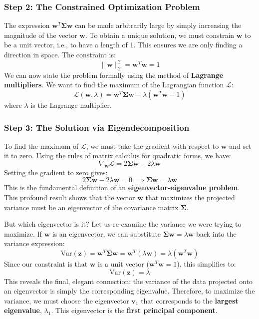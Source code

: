 \subsubsection{Step 2: The Constrained Optimization Problem}
The expression $\mathbf{w}^T \mathbf{\Sigma} \mathbf{w}$ can be made arbitrarily large by simply increasing the magnitude of the vector $\mathbf{w}$. To obtain a unique solution, we must constrain $\mathbf{w}$ to be a unit vector, i.e., to have a length of 1. This ensures we are only finding a direction in space. The constraint is:
$$ \|\mathbf{w}\|_2^2 = \mathbf{w}^T \mathbf{w} = 1 $$
We can now state the problem formally using the method of \textbf{Lagrange multipliers}. We want to find the maximum of the Lagrangian function $\mathcal{L}$:
$$ \mathcal{L}(\mathbf{w}, \lambda) = \mathbf{w}^T \mathbf{\Sigma} \mathbf{w} - \lambda(\mathbf{w}^T \mathbf{w} - 1) $$
where $\lambda$ is the Lagrange multiplier.

\subsubsection{Step 3: The Solution via Eigendecomposition}
To find the maximum of $\mathcal{L}$, we must take the gradient with respect to $\mathbf{w}$ and set it to zero. Using the rules of matrix calculus for quadratic forms, we have:
$$ \nabla_{\mathbf{w}} \mathcal{L} = 2\mathbf{\Sigma} \mathbf{w} - 2\lambda \mathbf{w} $$
Setting the gradient to zero gives:
$$ 2\mathbf{\Sigma} \mathbf{w} - 2\lambda \mathbf{w} = 0 \implies \mathbf{\Sigma} \mathbf{w} = \lambda \mathbf{w} $$
This is the fundamental definition of an \textbf{eigenvector-eigenvalue problem}. This profound result shows that the vector $\mathbf{w}$ that maximizes the projected variance must be an eigenvector of the covariance matrix $\mathbf{\Sigma}$.

But which eigenvector is it? Let us re-examine the variance we were trying to maximize. If $\mathbf{w}$ is an eigenvector, we can substitute $\mathbf{\Sigma} \mathbf{w} = \lambda \mathbf{w}$ back into the variance expression:
$$ \text{Var}(\mathbf{z}) = \mathbf{w}^T \mathbf{\Sigma} \mathbf{w} = \mathbf{w}^T (\lambda \mathbf{w}) = \lambda (\mathbf{w}^T \mathbf{w}) $$
Since our constraint is that $\mathbf{w}$ is a unit vector ($\mathbf{w}^T \mathbf{w} = 1$), this simplifies to:
$$ \text{Var}(\mathbf{z}) = \lambda $$
This reveals the final, elegant connection: the variance of the data projected onto an eigenvector is simply the corresponding eigenvalue. Therefore, to maximize the variance, we must choose the eigenvector $\mathbf{v}_1$ that corresponds to the \textbf{largest eigenvalue}, $\lambda_1$. This eigenvector is the \textbf{first principal component}.


